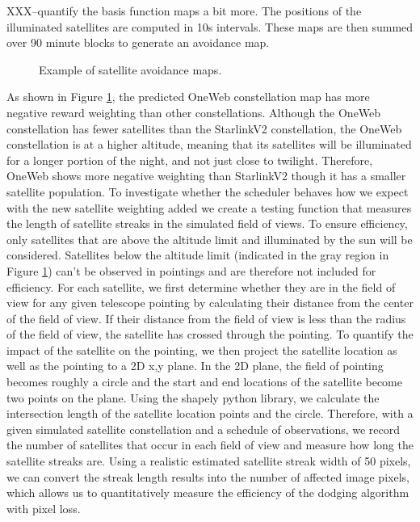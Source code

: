 \documentclass[linenumbers]{aastex631}
\begin{document}
XXX--quantify the basis function maps a bit more. The positions of the illuminated satellites are computed in 10s intervals. These maps are then summed over 90 minute blocks to generate an avoidance map. 

\begin{figure}[ht!]
\caption{Example of satellite avoidance maps. \label{fig-simulated-scheduler}}
\end{figure}

As shown in Figure \ref{fig-simulated-scheduler}, the predicted OneWeb constellation map has more negative reward
weighting than other constellations. Although the OneWeb constellation has fewer satellites than
the StarlinkV2 constellation, the OneWeb constellation is at a higher altitude, meaning that its
satellites will be illuminated for a longer portion of the night, and not just close to twilight.
Therefore, OneWeb shows more negative weighting than StarlinkV2 though it has a smaller
satellite population.
To investigate whether the scheduler behaves how we expect with the new satellite
weighting added we create a testing function that measures the length of satellite streaks in the
simulated field of views. To ensure efficiency, only satellites that are above the altitude limit and
illuminated by the sun will be considered. Satellites below the altitude limit (indicated in the gray
region in Figure \ref{fig-simulated-scheduler}) can’t be observed in pointings and are therefore not included for efficiency.
For each satellite, we first determine whether they are in the field of view for any given
telescope pointing by calculating their distance from the center of the field of view. If their
distance from the field of view is less than the radius of the field of view, the satellite has crossed
through the pointing. To quantify the impact of the satellite on the pointing, we then project the satellite location as well as the pointing to a 2D x,y plane. In the 2D plane, the field of pointing
becomes roughly a circle and the start and end locations of the satellite become two points on the
plane. Using the shapely python library, we calculate the intersection length of the satellite location
points and the circle.
Therefore, with a given simulated satellite constellation and a schedule of observations,
we record the number of satellites that occur in each field of view and measure how long the
satellite streaks are. Using a realistic estimated satellite streak width of 50 pixels, we can convert
the streak length results into the number of affected image pixels, which allows us to
quantitatively measure the efficiency of the dodging algorithm with pixel loss. 
\end{document}
